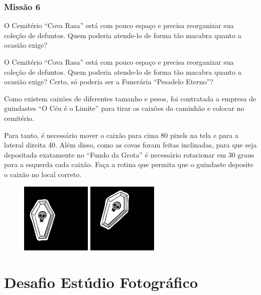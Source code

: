 \documentclass[
	12pt,				%
	oneside,			%
	a4paper,			%
	english,			%
	french,				%
	spanish,			%
	brazil,				%
	]{abntex2}
\begin{document}
\begin{apendicesenv}
\subsection{Missão 6}

O Cemitério “Cova Rasa” está com pouco espaço e precisa reorganizar sua coleção de defuntos. Quem poderia atende-lo de forma tão macabra quanto a ocasião exige?

O Cemitério “Cova Rasa” está com pouco espaço e precisa reorganizar sua coleção de defuntos. Quem poderia atende-lo de forma tão macabra quanto a ocasião exige? Certo, só poderia ser a Funerária “Pesadelo Eterno”?

Como existem caixões de diferentes tamanho e pesos, foi contratada a empresa de guindastes “O Céu é o Limite” para tirar os caixões do caminhão e colocar no cemitério.

Para tanto, é necessário mover o caixão para cima 80 pixels na tela e para a lateral direita 40. Além disso, como as covas foram feitas inclinadas, para que seja depositada exatamente no “Fundo da Grota” é necessário rotacionar em 30 graus para a esquerda cada caixão. Faça a rotina que permita que o guindaste deposite o caixão no local correto.

\begin{figure}[H]
\centering
\includegraphics[width=0.3\textwidth]{imagens/desafios/coffin2d00.jpg}
\includegraphics[width=0.3\textwidth]{imagens/desafios/mission6.png}
\end{figure}


\chapter{Desafio Estúdio Fotográfico}
\label{apen:estudioFotografico}


\end{apendicesenv}
\end{document}
